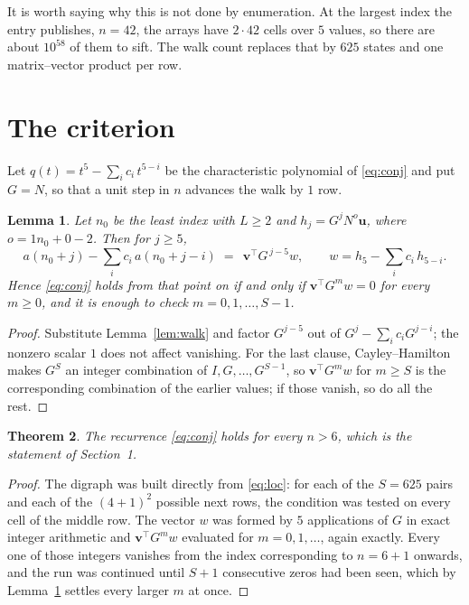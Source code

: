 \documentclass[11pt,a4paper]{article}
\theoremstyle{plain}
\newtheorem{theorem}{Theorem}
\newtheorem{lemma}[theorem]{Lemma}
\theoremstyle{definition}
\begin{document}
It is worth saying why this is not done by enumeration. At the largest index the entry
publishes, $n=42$, the arrays have $2\cdot42$ cells over
$5$ values, so there are about $10^{58}$ of them to sift. The
walk count replaces that by $625$ states and one matrix--vector product per row.
\section{The criterion}

Let $q(t)=t^{5}-\sum_i c_i\,t^{5-i}$ be the characteristic polynomial of
\eqref{eq:conj} and put $G=N$, so that a unit step in $n$ advances the walk by
$1$ row.

\begin{lemma}\label{lem:crit}
Let $n_0$ be the least index with $L\ge2$ and $h_j=G^{j}N^{o}\mathbf{u}$, where
$o=1n_0+0-2$. Then for $j\ge5$,
\[
a(n_0+j)-\sum_i c_i\,a(n_0+j-i)\;=\;\,\mathbf{v}^{\!\top}G^{\,j-5}w,
\qquad w=h_{5}-\sum_i c_i\,h_{5-i} .
\]
Hence \eqref{eq:conj} holds from that point on if and only if
$\mathbf{v}^{\!\top}G^{m}w=0$ for every $m\ge0$, and it is enough to check
$m=0,1,\dots,S-1$.
\end{lemma}

\begin{proof}
Substitute Lemma~\ref{lem:walk} and factor $G^{j-5}$ out of
$G^{j}-\sum_ic_iG^{j-i}$; the nonzero scalar $1$ does not affect
vanishing. For the last clause, Cayley--Hamilton makes $G^{S}$ an integer combination of
$I,G,\dots,G^{S-1}$, so $\mathbf{v}^{\!\top}G^{m}w$ for $m\ge S$ is the corresponding
combination of the earlier values; if those vanish, so do all the rest.
\end{proof}

\begin{theorem}
The recurrence \eqref{eq:conj} holds for every $n>6$, which is the statement of
Section~1.
\end{theorem}

\begin{proof}
The digraph was built directly from \eqref{eq:loc}: for each of the $S=625$ pairs and each
of the $(4+1)^{2}$ possible next rows, the condition was tested on every cell of
the middle row. The vector $w$ was formed by $5$ applications of $G$ in exact integer
arithmetic and $\mathbf{v}^{\!\top}G^{m}w$ evaluated for $m=0,1,\dots$, again exactly.
Every one of those integers vanishes from the index corresponding to $n=6+1$ onwards,
and the run was continued until $S+1$ consecutive zeros had been seen, which by
Lemma~\ref{lem:crit} settles every larger $m$ at once.
\end{proof}
\end{document}
